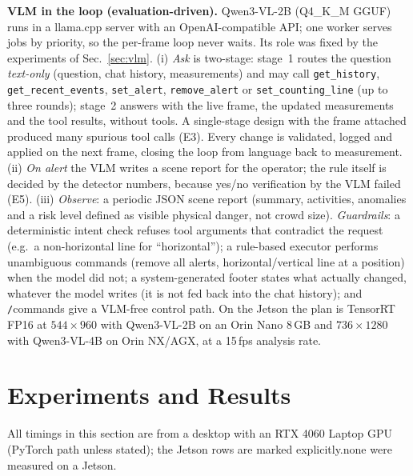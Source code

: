 \documentclass[conference]{IEEEtran}
\begin{document}
\textbf{VLM in the loop (evaluation-driven).} Qwen3-VL-2B (Q4\_K\_M GGUF) runs in a llama.cpp server with an
OpenAI-compatible API; one worker serves jobs by priority, so the per-frame loop never waits. Its role was fixed
by the experiments of Sec.~\ref{sec:vlm}. (i) \emph{Ask} is two-stage: stage~1 routes the question
\emph{text-only} (question, chat history, measurements) and may call \texttt{get\_history},
\texttt{get\_recent\_events}, \texttt{set\_alert}, \texttt{remove\_alert} or \texttt{set\_counting\_line} (up to
three rounds); stage~2 answers with the live frame, the updated measurements and the tool results, without tools.
A single-stage design with the frame attached produced many spurious tool calls (E3). Every change is validated,
logged and applied on the next frame, closing the loop from language back to measurement. (ii) \emph{On alert}
the VLM writes a scene report for the operator; the rule itself is decided by the detector numbers, because
yes/no verification by the VLM failed (E5). (iii) \emph{Observe}: a periodic JSON scene report (summary,
activities, anomalies and a risk level defined as visible physical danger, not crowd size). \emph{Guardrails}: a
deterministic intent check refuses tool arguments that contradict the request (e.g.\ a non-horizontal line for
``horizontal''); a rule-based executor performs unambiguous commands (remove all alerts, horizontal/vertical line
at a position) when the model did not; a system-generated footer states what actually changed, whatever the model
writes (it is not fed back into the chat history); and \texttt{/}commands give a VLM-free control path.
On the Jetson the plan is TensorRT FP16 at $544{\times}960$ with Qwen3-VL-2B on an Orin Nano 8\,GB and
$736{\times}1280$ with Qwen3-VL-4B on Orin NX/AGX, at a 15\,fps analysis rate.

\section{Experiments and Results}
All timings in this section are from a desktop with an RTX 4060 Laptop GPU (PyTorch path unless stated);
\ifHaveJetson the Jetson rows are marked explicitly.\else none were measured on a Jetson.\fi
\end{document}
